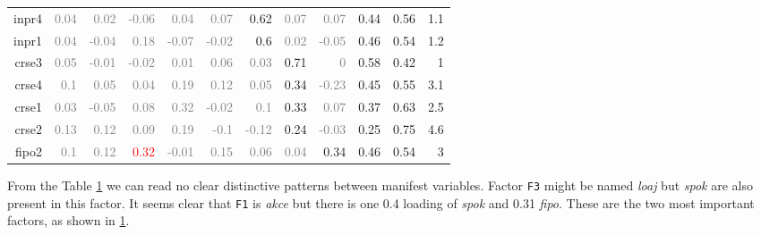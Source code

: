 \documentclass[10pt,a4paper]{article}
\begin{document}
\begin{table}[htbp]
\begin{tabular}{r|rrrrrrrr|rrr}
    inpr4 & \textcolor{Gray}{0.04} & \textcolor{Gray}{0.02} & \textcolor{Gray}{-0.06} & \textcolor{Gray}{0.04} & \textcolor{Gray}{0.07} & \textcolor{NavyBlue}{0.62} & \textcolor{Gray}{0.07} & \textcolor{Gray}{0.07} & 0.44 & 0.56 & 1.1 \\
    inpr1 & \textcolor{Gray}{0.04} & \textcolor{Gray}{-0.04} & \textcolor{Gray}{0.18} & \textcolor{Gray}{-0.07} & \textcolor{Gray}{-0.02} & \textcolor{NavyBlue}{0.6} & \textcolor{Gray}{0.02} & \textcolor{Gray}{-0.05} & 0.46 & 0.54 & 1.2 \\
    crse3 & \textcolor{Gray}{0.05} & \textcolor{Gray}{-0.01} & \textcolor{Gray}{-0.02} & \textcolor{Gray}{0.01} & \textcolor{Gray}{0.06} & \textcolor{Gray}{0.03} & \textcolor{NavyBlue}{0.71} & \textcolor{Gray}{0   } & 0.58 & 0.42 & 1 \\
    crse4 & \textcolor{Gray}{0.1 } & \textcolor{Gray}{0.05} & \textcolor{Gray}{0.04} & \textcolor{Gray}{0.19} & \textcolor{Gray}{0.12} & \textcolor{Gray}{0.05} & \textcolor{NavyBlue}{0.34} & \textcolor{Gray}{-0.23} & 0.45 & 0.55 & 3.1 \\
    crse1 & \textcolor{Gray}{0.03} & \textcolor{Gray}{-0.05} & \textcolor{Gray}{0.08} & \textcolor{Gray}{0.32} & \textcolor{Gray}{-0.02} & \textcolor{Gray}{0.1 } & \textcolor{NavyBlue}{0.33} & \textcolor{Gray}{0.07} & 0.37 & 0.63 & 2.5 \\
    crse2 & \textcolor{Gray}{0.13} & \textcolor{Gray}{0.12} & \textcolor{Gray}{0.09} & \textcolor{Gray}{0.19} & \textcolor{Gray}{-0.1} & \textcolor{Gray}{-0.12} & \textcolor{NavyBlue}{0.24} & \textcolor{Gray}{-0.03} & 0.25 & 0.75 & 4.6 \\
    fipo2 & \textcolor{Gray}{0.1 } & \textcolor{Gray}{0.12} & \textcolor{Red}{0.32} & \textcolor{Gray}{-0.01} & \textcolor{Gray}{0.15} & \textcolor{Gray}{0.06} & \textcolor{Gray}{0.04} & \textcolor{NavyBlue}{0.34} & 0.46 & 0.54 & 3\\
    \end{tabular}
  \label{t:load1}%
\end{table}%

From the Table \ref{t:load1} we can read no clear distinctive patterns between manifest variables. Factor \texttt{F3} might be named \emph{loaj} but \emph{spok} are also present in this factor. It seems clear that \texttt{F1} is \emph{akce} but there is one 0.4 loading of \emph{spok} and 0.31 \emph{fipo}.  These are the two most important factors, as shown in \ref{t:load1}.
\end{document}
